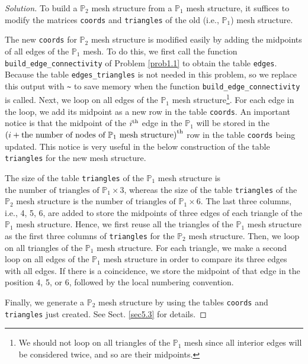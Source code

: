 \documentclass[11pt,a4paper,center,notitlepage]{article}
\numberwithin{equation}{section}
\begin{document}
\begin{proof}[Solution] 
To build a $\mathbb{P}_2$ mesh structure from a $\mathbb{P}_1$ mesh structure, it suffices to modify the matrices \verb|coords| and \verb|triangles| of the old (i.e., $\mathbb{P}_1$) mesh structure.

The new \verb|coords| for $\mathbb{P}_2$ mesh structure is modified easily by adding the midpoints of all edges of the $\mathbb{P}_1$ mesh. To do this, we first call the function \verb|build_edge_connectivity| of Problem \ref{prob1.1} to obtain the table \verb|edges|. Because the table \verb|edges_triangles| is not needed in this problem, so we replace this output with \verb|~| to save memory when the function \verb|build_edge_connectivity| is called. Next, we loop on all edges of the $\mathbb{P}_1$ mesh structure\footnote{We should not loop on all triangles of the $\mathbb{P}_1$ mesh since all interior edges will be considered twice, and so are their midpoints.}. For each edge in the loop, we add its midpoint as a new row in the table \verb|coords|. An important notice is that the midpoint of the $i^{\rm th}$ edge in the $\mathbb{P}_1$ will be stored in the $\left(i+ \mbox{the number of nodes of }\mathbb{P}_1 \mbox{ mesh structure}\right)^{\rm th}$ row in the table \verb|coords| being updated. This notice is very useful in the below construction of the table \verb|triangles| for the new mesh structure.

The size of the table \verb|triangles| of the $\mathbb{P}_1$ mesh structure is $\mbox{the number of triangles of }\mathbb{P}_1 \times 3$, whereas the size of the table \verb|triangles| of the $\mathbb{P}_2$ mesh structure is $\mbox{the number of triangles of }\mathbb{P}_1 \times 6$. The last three columns, i.e., 4, 5, 6, are added to store the midpoints of three edges of each triangle of the $\mathbb{P}_1$ mesh structure. Hence, we first reuse all the triangles of the $\mathbb{P}_1$ mesh structure as the first three columns of \verb|triangles| for the $\mathbb{P}_2$ mesh structure. Then, we loop on all triangles of the $\mathbb{P}_1$ mesh structure. For each triangle, we make a second loop on all edges of the $\mathbb{P}_1$ mesh structure in order to compare its three edges with all edges. If there is a coincidence, we store the midpoint of that edge in the position 4, 5, or 6, followed by the local numbering convention.

Finally, we generate a $\mathbb{P}_2$ mesh structure by using the tables \texttt{coords} and \texttt{triangles} just created. See Sect. \ref{sec5.3} for details.


\end{proof}
\end{document}
